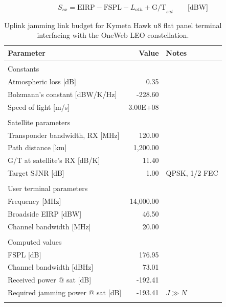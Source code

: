\documentclass[english, 12pt, a4paper, elec, utf8, a-1b, online]{aaltothesis}
\begin{document}
\begin{equation} \label{eq-signal-power-simplified}
  S_{rx} = \mathrm{EIRP} - \mathrm{FSPL} - L_{ath} + \mathrm{G/T}_{sat} \qquad \text{[dBW]}
\end{equation}

\begin{table}[h]
  \centering
  \caption{Uplink jamming link budget for Kymeta Hawk u8 flat panel terminal interfacing with the OneWeb LEO constellation.}
  \begin{tabular}{@{}lrl@{}}
    \toprule
    Parameter                             & Value     & Notes         \\ \midrule
                                          &           &               \\
    Constants                             &           &               \\ 
    Atmospheric loss {[}dB{]}             & 0.35      &               \\
    Bolzmann’s constant {[}dBW/K/Hz{]}    & -228.60   &               \\
    Speed of light {[}m/s{]}              & 3.00E+08  &               \\
                                          &           &               \\
    Satellite parameters                  &           &               \\ 
    Transponder bandwidth, RX {[}MHz{]}   & 120.00    &               \\
    Path distance {[}km{]}                & 1,200.00  &               \\
    G/T at satellite’s RX {[}dB/K{]}      & 11.40     &               \\
    Target SJNR {[}dB{]}                  & 1.00      & QPSK, 1/2 FEC \\
                                          &           &               \\
    User terminal parameters              &           &               \\ 
    Frequency {[}MHz{]}                   & 14,000.00 &               \\
    Broadside EIRP {[}dBW{]}              & 46.50     &               \\
    Channel bandwidth {[}MHz{]}           & 20.00     &               \\
                                          &           &               \\
    Computed values                       &           &               \\
    FSPL {[}dB{]}                         & 176.95    &               \\
    Channel bandwidth {[}dBHz{]}          & 73.01     &               \\
    Received power @ sat {[}dB{]}         & -192.41   &               \\
    Required jamming power @ sat {[}dB{]} & -193.41   & $J \gg N$     \\ \bottomrule
    \label{table-ul-jamming-link-budget}
  \end{tabular}
\end{table}
\end{document}
